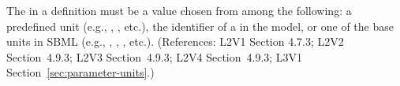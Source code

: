 The  in a \Parameter definition must be a value chosen from
among the following: a predefined unit (e.g., , ,
etc.), the identifier of a \UnitDefinition in the model, or one of the
base units in SBML (e.g., , , ,
etc.).  (References: L2V1 Section 4.7.3; L2V2 Section~4.9.3; L2V3
Section~4.9.3; L2V4 Section~4.9.3; L3V1 Section~\ref{sec:parameter-units}.)
